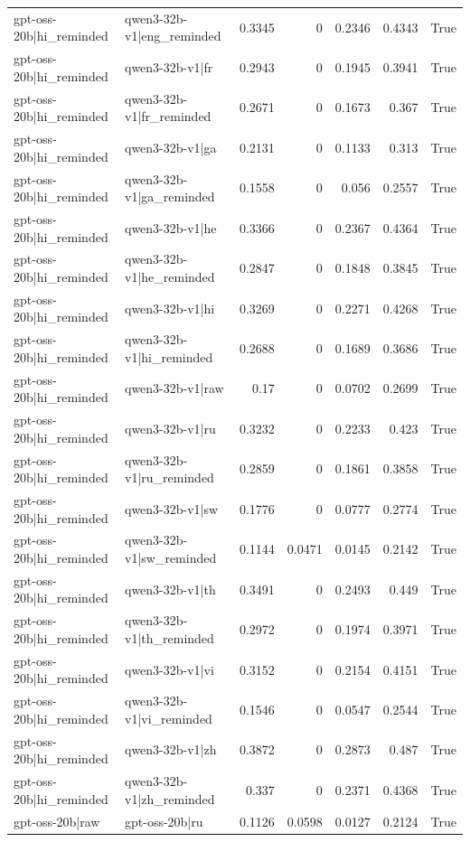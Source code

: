 \begin{table}
\begin{tabular}{l l r r r r l}
gpt-oss-20b|hi_reminded & qwen3-32b-v1|eng_reminded & 0.3345 & 0 & 0.2346 & 0.4343 & True \\
gpt-oss-20b|hi_reminded & qwen3-32b-v1|fr & 0.2943 & 0 & 0.1945 & 0.3941 & True \\
gpt-oss-20b|hi_reminded & qwen3-32b-v1|fr_reminded & 0.2671 & 0 & 0.1673 & 0.367 & True \\
gpt-oss-20b|hi_reminded & qwen3-32b-v1|ga & 0.2131 & 0 & 0.1133 & 0.313 & True \\
gpt-oss-20b|hi_reminded & qwen3-32b-v1|ga_reminded & 0.1558 & 0 & 0.056 & 0.2557 & True \\
gpt-oss-20b|hi_reminded & qwen3-32b-v1|he & 0.3366 & 0 & 0.2367 & 0.4364 & True \\
gpt-oss-20b|hi_reminded & qwen3-32b-v1|he_reminded & 0.2847 & 0 & 0.1848 & 0.3845 & True \\
gpt-oss-20b|hi_reminded & qwen3-32b-v1|hi & 0.3269 & 0 & 0.2271 & 0.4268 & True \\
gpt-oss-20b|hi_reminded & qwen3-32b-v1|hi_reminded & 0.2688 & 0 & 0.1689 & 0.3686 & True \\
gpt-oss-20b|hi_reminded & qwen3-32b-v1|raw & 0.17 & 0 & 0.0702 & 0.2699 & True \\
gpt-oss-20b|hi_reminded & qwen3-32b-v1|ru & 0.3232 & 0 & 0.2233 & 0.423 & True \\
gpt-oss-20b|hi_reminded & qwen3-32b-v1|ru_reminded & 0.2859 & 0 & 0.1861 & 0.3858 & True \\
gpt-oss-20b|hi_reminded & qwen3-32b-v1|sw & 0.1776 & 0 & 0.0777 & 0.2774 & True \\
gpt-oss-20b|hi_reminded & qwen3-32b-v1|sw_reminded & 0.1144 & 0.0471 & 0.0145 & 0.2142 & True \\
gpt-oss-20b|hi_reminded & qwen3-32b-v1|th & 0.3491 & 0 & 0.2493 & 0.449 & True \\
gpt-oss-20b|hi_reminded & qwen3-32b-v1|th_reminded & 0.2972 & 0 & 0.1974 & 0.3971 & True \\
gpt-oss-20b|hi_reminded & qwen3-32b-v1|vi & 0.3152 & 0 & 0.2154 & 0.4151 & True \\
gpt-oss-20b|hi_reminded & qwen3-32b-v1|vi_reminded & 0.1546 & 0 & 0.0547 & 0.2544 & True \\
gpt-oss-20b|hi_reminded & qwen3-32b-v1|zh & 0.3872 & 0 & 0.2873 & 0.487 & True \\
gpt-oss-20b|hi_reminded & qwen3-32b-v1|zh_reminded & 0.337 & 0 & 0.2371 & 0.4368 & True \\
gpt-oss-20b|raw & gpt-oss-20b|ru & 0.1126 & 0.0598 & 0.0127 & 0.2124 & True \\

\end{tabular}
\end{table}

